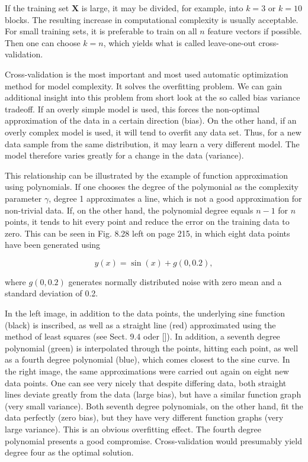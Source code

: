 \documentclass[10pt]{book}
\begin{document}
If the training set $\boldsymbol{X}$ is large, it may be divided, for example, into $k=3$ or $k=10$ blocks. The resulting increase in computational complexity is usually acceptable. For small training sets, it is preferable to train on all $n$ feature vectors if possible. Then one can choose $k=n$, which yields what is called leave-one-out cross-validation.

Cross-validation is the most important and most used automatic optimization method for model complexity. It solves the overfitting problem. We can gain additional insight into this problem from short look at the so called bias variance tradeoff. If an overly simple model is used, this forces the non-optimal approximation of the data in a certain direction (bias). On the other hand, if an overly complex model is used, it will tend to overfit any data set. Thus, for a new data sample from the same distribution, it may learn a very different model. The model therefore varies greatly for a change in the data (variance).

This relationship can be illustrated by the example of function approximation using polynomials. If one chooses the degree of the polymonial as the complexity parameter $\gamma$, degree 1 approximates a line, which is not a good approximation for non-trivial data. If, on the other hand, the polynomial degree equals $n-1$ for $n$ points, it tends to hit every point and reduce the error on the training data to zero. This can be seen in Fig. 8.28 left on page 215, in which eight data points have been generated using

$$
y(x)=\sin (x)+g(0,0.2),
$$

where $g(0,0.2)$ generates normally distributed noise with zero mean and a standard deviation of 0.2.

In the left image, in addition to the data points, the underlying sine function (black) is inscribed, as well as a straight line (red) approximated using the method of least squares (see Sect. 9.4 oder [\cite{ertel2015matheng}]). In addition, a seventh degree polynomial (green) is interpolated through the points, hitting each point, as well as a fourth degree polynomial (blue), which comes closest to the sine curve. In the right image, the same approximations were carried out again on eight new data points. One can see very nicely that despite differing data, both straight lines deviate greatly from the data (large bias), but have a similar function graph (very small variance). Both seventh degree polynomials, on the other hand, fit the data perfectly (zero bias), but they have very different function graphs (very large variance). This is an obvious overfitting effect. The fourth degree polynomial presents a good compromise. Cross-validation would presumably yield degree four as the optimal solution.
\end{document}
